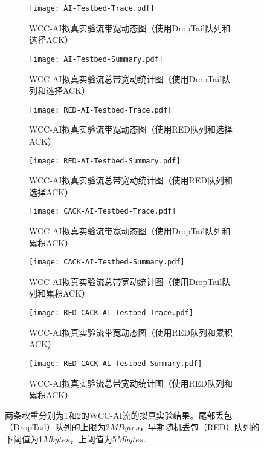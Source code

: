 \documentclass[winfonts]{njuthesis}
\begin{document}
\begin{figure*}[ht!]
	\begin{subfigure}{.5\textwidth}
    \centering
		\texttt{[image: AI-Testbed-Trace.pdf]}
    \caption{WCC-AI拟真实验流带宽动态图（使用DropTail队列和选择ACK）}
    \label{fig:AI-TestbedTrace}
  \end{subfigure}
	\begin{subfigure}{.5\textwidth}
    \centering
		\texttt{[image: AI-Testbed-Summary.pdf]}
    \caption{WCC-AI拟真实验流总带宽动统计图（使用DropTail队列和选择ACK）}
    \label{fig:AI-TestbedSum}
  \end{subfigure}
  \begin{subfigure}{.5\textwidth}
    \centering
		\texttt{[image: RED-AI-Testbed-Trace.pdf]}
    \caption{WCC-AI拟真实验流带宽动态图（使用RED队列和选择ACK）}
    \label{fig:RED-AI-TestbedTrace}
  \end{subfigure}
  \begin{subfigure}{.5\textwidth}
    \centering
		\texttt{[image: RED-AI-Testbed-Summary.pdf]}
    \caption{WCC-AI拟真实验流总带宽动统计图（使用RED队列和选择ACK）}
    \label{fig:RED-AI-TestbedSum}
  \end{subfigure}
	\begin{subfigure}{.5\textwidth}
    \centering
    \texttt{[image: CACK-AI-Testbed-Trace.pdf]}
    \caption{WCC-AI拟真实验流带宽动态图（使用DropTail队列和累积ACK）}
		\label{fig:CACK-AI-TestbedTrace}
  \end{subfigure}
	\begin{subfigure}{.5\textwidth}
    \centering
    \texttt{[image: CACK-AI-Testbed-Summary.pdf]}
    \caption{WCC-AI拟真实验流总带宽动统计图（使用DropTail队列和累积ACK）}
		\label{fig:CACK-AI-TestbedSum}
  \end{subfigure}
	\begin{subfigure}{.5\textwidth}
    \centering
    \texttt{[image: RED-CACK-AI-Testbed-Trace.pdf]}
    \caption{WCC-AI拟真实验流带宽动态图（使用RED队列和累积ACK）}
		\label{fig:RED-CACK-AI-TestbedTrace}
  \end{subfigure}
	\begin{subfigure}{.5\textwidth}
    \centering
    \texttt{[image: RED-CACK-AI-Testbed-Summary.pdf]}
    \caption{WCC-AI拟真实验流总带宽动统计图（使用RED队列和累积ACK）}
		\label{fig:RED-CACK-AI-TestbedSum}
  \end{subfigure}
  \caption{两条权重分别为1和2的WCC-AI流的拟真实验结果。尾部丢包（DropTail）队列的上限为2$MBytes$，早期随机丢包（RED）队列的下阈值为1$Mbytes$，上阈值为5$Mbytes$.}
  \label{fig:TestbedExp}
\end{figure*}
\end{document}
